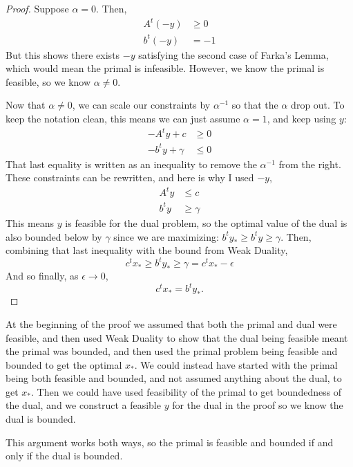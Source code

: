 \documentclass{article}
\begin{document}
\begin{proof}
	Suppose $\alpha = 0$. Then,
	\begin{align*}
		A^t (-y) &\ge 0 \\
		b^t (-y) &= - 1
	\end{align*}
	But this shows there exists $-y$ satisfying the second case of Farka's Lemma, which would mean the
	primal is infeasible. However, we know the primal is feasible, so we know $\alpha \neq 0$.

	Now that $\alpha \neq 0$, we can scale our constraints by $\alpha^{-1}$ so that the $\alpha$ drop
	out. To keep the notation clean, this means we can just assume $\alpha = 1$, and keep using $y$:
	\begin{align*}
		-A^t y + c &\ge 0 \\
		-b^t y + \gamma &\le 0
	\end{align*}
	That last equality is written as an inequality to remove the $\alpha^{-1}$ from the right. These
	constraints can be rewritten, and here is why I used $-y$,
	\begin{align*}
		A^t y &\le c \\
		b^t y &\ge \gamma
	\end{align*}
	This means $y$ is feasible for the dual problem, so the optimal value of the dual is also bounded
	below by $\gamma$ since we are maximizing: $b^ty_* \ge b^t y \ge \gamma$. Then, combining that last
	inequality with the bound from Weak Duality,
	\[ c^tx_* \ge b^t y_* \ge \gamma = c^tx_* - \epsilon \]
	And so finally, as $\epsilon \to 0$,
	\[ c^tx_* = b^t y_* \text{.}\]
\end{proof}

At the beginning of the proof we assumed that both the primal and dual were feasible, and then used
Weak Duality to show that the dual being feasible meant the primal was bounded, and then used the
primal problem being feasible and bounded to get the optimal $x_*$. We could instead have started
with the primal being both feasible and bounded, and not assumed anything about the dual, to get
$x_*$. Then we could have used feasibility of the primal to get boundedness of the dual, and we
construct a feasible $y$ for the dual in the proof so we know the dual is bounded.

This argument works both ways, so the primal is feasible and bounded if and only if the dual is
bounded.
\end{document}
